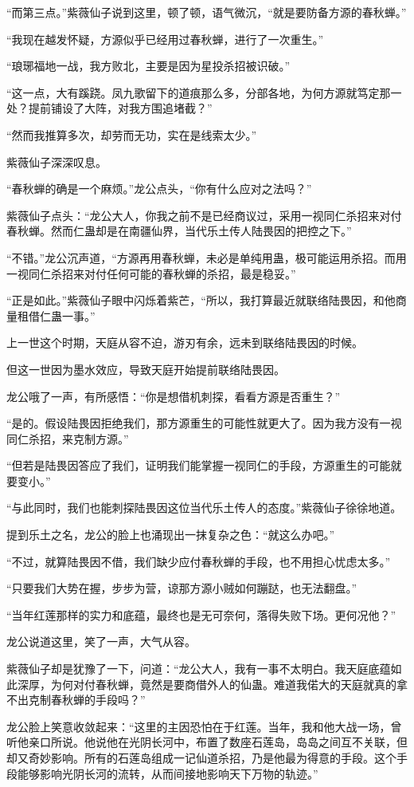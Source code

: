 \begin{this_body}
“而第三点。”紫薇仙子说到这里，顿了顿，语气微沉，“就是要防备方源的春秋蝉。”

“我现在越发怀疑，方源似乎已经用过春秋蝉，进行了一次重生。”

“琅琊福地一战，我方败北，主要是因为星投杀招被识破。”

“这一点，大有蹊跷。凤九歌留下的道痕那么多，分部各地，为何方源就笃定那一处？提前铺设了大阵，对我方围追堵截？”

“然而我推算多次，却劳而无功，实在是线索太少。”

紫薇仙子深深叹息。

“春秋蝉的确是一个麻烦。”龙公点头，“你有什么应对之法吗？”

紫薇仙子点头：“龙公大人，你我之前不是已经商议过，采用一视同仁杀招来对付春秋蝉。然而仁蛊却是在南疆仙界，当代乐土传人陆畏因的把控之下。”

“不错。”龙公沉声道，“方源再用春秋蝉，未必是单纯用蛊，极可能运用杀招。而用一视同仁杀招来对付任何可能的春秋蝉的杀招，最是稳妥。”

“正是如此。”紫薇仙子眼中闪烁着紫芒，“所以，我打算最近就联络陆畏因，和他商量租借仁蛊一事。”

上一世这个时期，天庭从容不迫，游刃有余，远未到联络陆畏因的时候。

但这一世因为墨水效应，导致天庭开始提前联络陆畏因。

龙公哦了一声，有所感悟：“你是想借机刺探，看看方源是否重生？”

“是的。假设陆畏因拒绝我们，那方源重生的可能性就更大了。因为我方没有一视同仁杀招，来克制方源。”

“但若是陆畏因答应了我们，证明我们能掌握一视同仁的手段，方源重生的可能就要变小。”

“与此同时，我们也能刺探陆畏因这位当代乐土传人的态度。”紫薇仙子徐徐地道。

提到乐土之名，龙公的脸上也涌现出一抹复杂之色：“就这么办吧。”

“不过，就算陆畏因不借，我们缺少应付春秋蝉的手段，也不用担心忧虑太多。”

“只要我们大势在握，步步为营，谅那方源小贼如何蹦跶，也无法翻盘。”

“当年红莲那样的实力和底蕴，最终也是无可奈何，落得失败下场。更何况他？”

龙公说道这里，笑了一声，大气从容。

紫薇仙子却是犹豫了一下，问道：“龙公大人，我有一事不太明白。我天庭底蕴如此深厚，为何对付春秋蝉，竟然是要商借外人的仙蛊。难道我偌大的天庭就真的拿不出克制春秋蝉的手段吗？”

龙公脸上笑意收敛起来：“这里的主因恐怕在于红莲。当年，我和他大战一场，曾听他亲口所说。他说他在光阴长河中，布置了数座石莲岛，岛岛之间互不关联，但却又奇妙影响。所有的石莲岛组成一记仙道杀招，乃是他最为得意的手段。这个手段能够影响光阴长河的流转，从而间接地影响天下万物的轨迹。”


\end{this_body}
